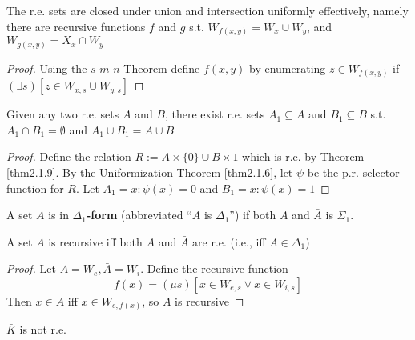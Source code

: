 \documentclass[11pt]{article}
\begin{document}
\begin{theorem}
\label{thm2.1.9}
The r.e. sets are closed under union and intersection uniformly effectively,
namely there are recursive functions \(f\) and \(g\) s.t.
\(W_{f(x,y)}=W_x\cup W_y\), and \(W_{g(x,y)}=X_x\cap W_y\)
\end{theorem}

\begin{proof}
Using the \(s\)-\(m\)-\(n\) Theorem define \(f(x,y)\) by enumerating
\(z\in W_{f(x,y)}\) if \((\exists s)[z\in W_{x,s}\cup W_{y,s}]\)
\end{proof}

\begin{corollary}
\label{cor2.1.10}
Given any two r.e. sets \(A\) and \(B\), there exist r.e. sets
\(A_1\subseteq A\) and \(B_1\subseteq B\) s.t. \(A_1\cap B_1=\emptyset\) and
\(A_1\cup B_1=A\cup B\)
\end{corollary}

\begin{proof}
Define the relation \(R:=A\times\{0\}\cup B\times{1}\) which is r.e. by
Theorem \ref{thm2.1.9}. By the Uniformization Theorem \ref{thm2.1.6}, let \(\psi\) be
the p.r. selector function for \(R\). Let \(A_1=x:\psi(x)=0\) and
\(B_1=x:\psi(x)=1\) 
\end{proof}

\begin{definition}[]
A set \(A\) is in \textbf{\(\Delta_1\)-form} (abbreviated ``\(A\) is \(\Delta_1\)'')
if both \(A\) and \(\bar{A}\) is \(\Sigma_1\).
\end{definition}

\begin{theorem}
\label{thm2.1.12}
A set \(A\) is recursive iff both \(A\) and \(\bar{A}\) are r.e. (i.e., iff \(A\in\Delta_1\))
\end{theorem}

\begin{proof}
Let \(A=W_e,\bar{A}=W_i\). Define the recursive function
\begin{equation*}
f(x)=(\mu s)[x\in W_{e,s}\vee x\in W_{i,s}]
\end{equation*}
Then \(x\in A\) iff \(x\in W_{e,f(x)}\), so \(A\) is recursive
\end{proof}

\begin{corollary}[]
\label{cor2.1.13}
\(\bar{K}\) is not r.e.
\end{corollary}
\end{document}
